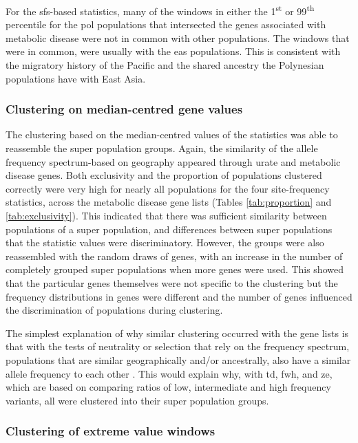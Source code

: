 \documentclass[twoside,openright]{report}
\begin{document}
For the \gls{sfs}-based statistics, many of the windows in either the
1\textsuperscript{st} or 99\textsuperscript{th} percentile for the
\gls{pol} populations that intersected the genes associated with
metabolic disease were not in common with other populations. The windows
that were in common, were usually with the \gls{eas} populations. This
is consistent with the migratory history of the Pacific and the shared
ancestry the Polynesian populations have with East Asia.

\subsubsection{Clustering on median-centred gene
values}\label{clustering-on-median-centred-gene-values}

The clustering based on the median-centred values of the statistics was
able to reassemble the super population groups. Again, the similarity of
the allele frequency spectrum-based on geography appeared through urate
and metabolic disease genes. Both exclusivity and the proportion of
populations clustered correctly were very high for nearly all
populations for the four site-frequency statistics, across the metabolic
disease gene lists (Tables \ref{tab:proportion} and
\ref{tab:exclusivity}). This indicated that there was sufficient
similarity between populations of a super population, and differences
between super populations that the statistic values were discriminatory.
However, the groups were also reassembled with the random draws of
genes, with an increase in the number of completely grouped super
populations when more genes were used. This showed that the particular
genes themselves were not specific to the clustering but the frequency
distributions in genes were different and the number of genes influenced
the discrimination of populations during clustering.

The simplest explanation of why similar clustering occurred with the
gene lists is that with the tests of neutrality or selection that rely
on the frequency spectrum, populations that are similar geographically
and/or ancestrally, also have a similar allele frequency to each other
\citep{Gravel2011}. This would explain why, with \gls{td}, \gls{fwh},
and \gls{ze}, which are based on comparing ratios of low, intermediate
and high frequency variants, all were clustered into their super
population groups.

\subsubsection{Clustering of extreme value
windows}\label{clustering-of-extreme-value-windows}
\end{document}
